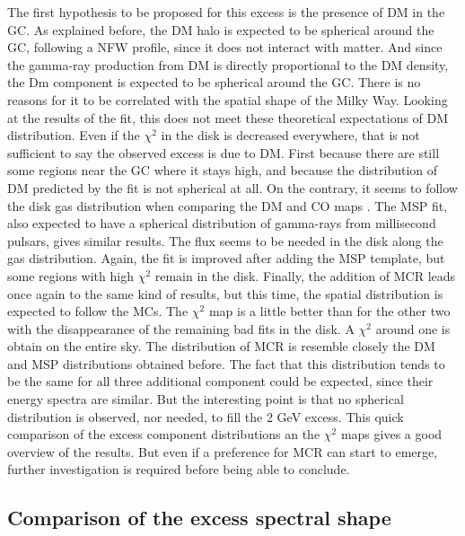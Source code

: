The first hypothesis to be proposed for this excess is the presence of DM in the GC. As explained before, the DM halo is expected to be spherical around the GC, following a NFW profile, since it does not interact with matter. And since the gamma-ray production from DM is directly proportional to the DM density, the Dm component is expected to be spherical around the GC. There is no reasons for it to be correlated with the spatial shape of the Milky Way. Looking at the results of the fit, this does not meet these theoretical expectations of DM distribution. Even if the $\chi^2$ in the disk is decreased everywhere, that is not sufficient to say the observed excess is due to DM. First because there are still some regions near the GC where it stays high, and because the distribution of DM predicted by the fit is not spherical at all. On the contrary, it seems to follow the disk gas distribution when comparing the DM and CO maps .
The MSP fit, also expected to have a spherical distribution of gamma-rays from millisecond pulsars, gives similar results. The flux seems to be needed in the disk along the gas distribution. Again, the fit is improved after adding the MSP template, but some regions with high $\chi^2$ remain in the disk. 
Finally, the addition of MCR leads once again to the same kind of results, but this time, the spatial distribution is expected to follow the MCs. The $\chi^2$ map is a little better than for the other two with the disappearance of the remaining bad fits in the disk. A $\chi^2$ around one is obtain on the entire sky. The distribution of MCR is resemble closely the DM and MSP distributions obtained before. 
The fact that this distribution tends to be the same for all three additional component could be expected, since their energy spectra are similar. But the interesting point is that no spherical distribution is observed, nor needed, to fill the 2 GeV excess.
This quick comparison of the excess component distributions an the $\chi^2$ maps gives a good overview of the results. But even if a preference for MCR can start to emerge, further investigation is required before being able to conclude.


\subsection{Comparison of the excess spectral shape}

